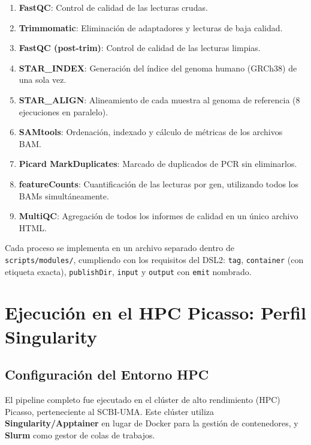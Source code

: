 \documentclass[11pt,a4paper]{article}
\begin{document}
\begin{enumerate}
    \item \textbf{FastQC}: Control de calidad de las lecturas crudas.
    \item \textbf{Trimmomatic}: Eliminación de adaptadores y lecturas de baja calidad.
    \item \textbf{FastQC (post-trim)}: Control de calidad de las lecturas limpias.
    \item \textbf{STAR\_INDEX}: Generación del índice del genoma humano (GRCh38) de una sola vez.
    \item \textbf{STAR\_ALIGN}: Alineamiento de cada muestra al genoma de referencia (8 ejecuciones en paralelo).
    \item \textbf{SAMtools}: Ordenación, indexado y cálculo de métricas de los archivos BAM.
    \item \textbf{Picard MarkDuplicates}: Marcado de duplicados de PCR sin eliminarlos.
    \item \textbf{featureCounts}: Cuantificación de las lecturas por gen, utilizando todos los BAMs simultáneamente.
    \item \textbf{MultiQC}: Agregación de todos los informes de calidad en un único archivo HTML.
\end{enumerate}

Cada proceso se implementa en un archivo separado dentro de \texttt{scripts/modules/}, cumpliendo con los requisitos del DSL2: \texttt{tag}, \texttt{container} (con etiqueta exacta), \texttt{publishDir}, \texttt{input} y \texttt{output} con \texttt{emit} nombrado.

\section{Ejecución en el HPC Picasso: Perfil Singularity}
\label{sec:picasso}

\subsection{Configuración del Entorno HPC}

El pipeline completo fue ejecutado en el clúster de alto rendimiento (HPC) Picasso, perteneciente al SCBI-UMA. Este clúster utiliza \textbf{Singularity/Apptainer} en lugar de Docker para la gestión de contenedores, y \textbf{Slurm} como gestor de colas de trabajos.
\end{document}
